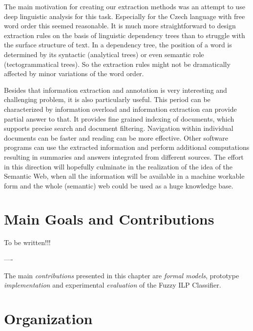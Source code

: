 
The main motivation for creating our extraction methods was an attempt to use deep linguistic analysis for this task. Especially for the Czech language with free word order this seemed reasonable. It is much more straightforward to design extraction rules on the basis of linguistic dependency trees than to struggle with the surface structure of text. In a dependency tree, the position of a word is determined by its syntactic (analytical trees) or even semantic role (tectogrammatical trees). So the extraction rules might not be dramatically affected by minor variations of the word order.

Besides that information extraction and annotation is very interesting and challenging problem, it is also particularly useful. This period can be characterized by information overload and information extraction can provide partial answer to that. It provides fine grained indexing of documents, which supports precise search and document filtering. Navigation within individual documents can be faster and reading can be more effective. Other software programs can use the extracted information and perform additional computations resulting in summaries and answers integrated from different sources.  The effort in this direction will hopefully culminate in the realization of the idea of the Semantic Web, when all the information will be available in a machine workable form and the whole (semantic) web could be used as a huge knowledge base.



\section{Main Goals and Contributions}

To be written!!!

----

The main \emph{contributions} presented in this chapter are \emph{formal models}, prototype \emph{implementation} and experimental \emph{evaluation} of the Fuzzy ILP Classifier.



\section{Organization}

